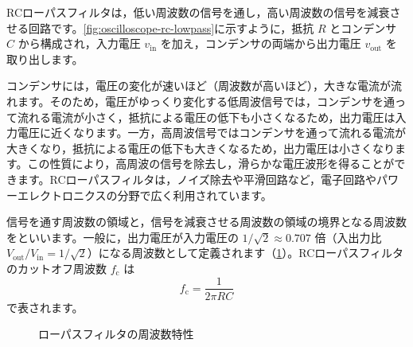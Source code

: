 RCローパスフィルタは，低い周波数の信号を通し，高い周波数の信号を減衰させる回路です。\cref{fig:oscilloscope-rc-lowpass}に示すように，抵抗 $R$ とコンデンサ $C$ から構成され，入力電圧 $v_{\mathrm{in}}$ を加え，コンデンサの両端から出力電圧 $v_{\mathrm{out}}$ を取り出します。

コンデンサには，電圧の変化が速いほど（周波数が高いほど），大きな電流が流れます。そのため，電圧がゆっくり変化する低周波信号では，コンデンサを通って流れる電流が小さく，抵抗による電圧の低下も小さくなるため，出力電圧は入力電圧に近くなります。一方，高周波信号ではコンデンサを通って流れる電流が大きくなり，抵抗による電圧の低下も大きくなるため，出力電圧は小さくなります。この性質により，高周波の信号を除去し，滑らかな電圧波形を得ることができます。RCローパスフィルタは，ノイズ除去や平滑回路など，電子回路やパワーエレクトロニクスの分野で広く利用されています。

信号を通す周波数の領域と，信号を減衰させる周波数の領域の境界となる周波数をといいます。一般に，出力電圧が入力電圧の $1/\sqrt{2}\approx 0.707$ 倍（入出力比 $V_\mathrm{out}/V_\mathrm{in}=1/\sqrt{2}$）になる周波数として定義されます（\cref{fig:oscilloscope-lowpass-response}）。RCローパスフィルタのカットオフ周波数 $f_\mathrm{c}$ は
\begin{equation}
  f_\mathrm{c} = \frac{1}{2\pi RC}
  \label{eq:oscilloscope-cutoff}
\end{equation}
で表されます。

\begin{figure}[htbp]
  \centering
  \caption{ローパスフィルタの周波数特性}
  \label{fig:oscilloscope-lowpass-response}
\end{figure}

